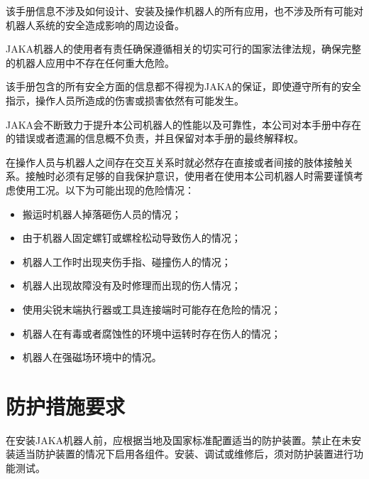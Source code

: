 \documentclass[a4paper,11pt,english,openany,oneside]{sphinxmanual}
\begin{document}
\sphinxAtStartPar
该手册信息不涉及如何设计、安装及操作机器人的所有应用，也不涉及所有可能对机器人系统的安全造成影响的周边设备。

\sphinxAtStartPar
JAKA机器人的使用者有责任确保遵循相关的切实可行的国家法律法规，确保完整的机器人应用中不存在任何重大危险。

\sphinxAtStartPar
该手册包含的所有安全方面的信息都不得视为JAKA的保证，即使遵守所有的安全指示，操作人员所造成的伤害或损害依然有可能发生。

\sphinxAtStartPar
JAKA会不断致力于提升本公司机器人的性能以及可靠性，本公司对本手册中存在的错误或者遗漏的信息概不负责，并且保留对本手册的最终解释权。

\sphinxAtStartPar
{}

\sphinxAtStartPar
在操作人员与机器人之间存在交互关系时就必然存在直接或者间接的肢体接触关系。接触时必须有足够的自我保护意识，使用者在使用本公司机器人时需要谨慎考虑使用工况。以下为可能出现的危险情况：
\begin{itemize}
\item {} 
\sphinxAtStartPar
搬运时机器人掉落砸伤人员的情况；

\item {} 
\sphinxAtStartPar
由于机器人固定螺钉或螺栓松动导致伤人的情况；

\item {} 
\sphinxAtStartPar
机器人工作时出现夹伤手指、碰撞伤人的情况；

\item {} 
\sphinxAtStartPar
机器人出现故障没有及时修理而出现的伤人情况；

\item {} 
\sphinxAtStartPar
使用尖锐末端执行器或工具连接端时可能存在危险的情况；

\item {} 
\sphinxAtStartPar
机器人在有毒或者腐蚀性的环境中运转时存在伤人的情况；

\item {} 
\sphinxAtStartPar
机器人在强磁场环境中的情况。

\end{itemize}


\section{防护措施要求}
\label{\detokenize{05 _u5b89_u5168_u89c4_u8303:id8}}
\sphinxAtStartPar
在安装JAKA机器人前，应根据当地及国家标准配置适当的防护装置。禁止在未安装适当防护装置的情况下启用各组件。安装、调试或维修后，须对防护装置进行功能测试。
\end{document}
